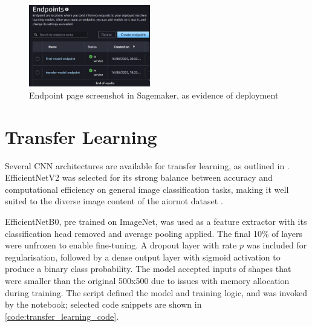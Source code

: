 \begin{figure}[h]
    \centering
    \includegraphics[width=200px]{figures/endpoints_screenshot.png} %
    \centering
    \caption{Endpoint page screenshot in Sagemaker, as evidence of deployment} %
    \label{fig:endpoint} %
\end{figure}

\begin{figure}[h]
        
\end{figure}

\newpage

\section{Transfer Learning} \label{sec:transfer_learning}

Several CNN architectures are available for transfer learning, as outlined in \cite{keras_applications}. EfficientNetV2 was selected for its strong balance between accuracy and computational efficiency on general image classification tasks, making it well suited to the diverse image content of the aiornot dataset \cite{keras_applications, tan2021efficientnetv2}.

EfficientNetB0, pre trained on ImageNet, was used as a feature extractor with its classification head removed and average pooling applied. The final 10\% of layers were unfrozen to enable fine-tuning. A dropout layer with rate $p$ was included for regularisation, followed by a dense output layer with sigmoid activation to produce a binary class probability. The model accepted inputs of shapes that were smaller than the original 500x500 due to issues with memory allocation during training. The  script defined the model and training logic, and was invoked by the  notebook; selected code snippets are shown in \cref{code:transfer_learning_code}.

\begin{figure}[h]
    
    \label{fig:transfer_learning_code}
\end{figure}

